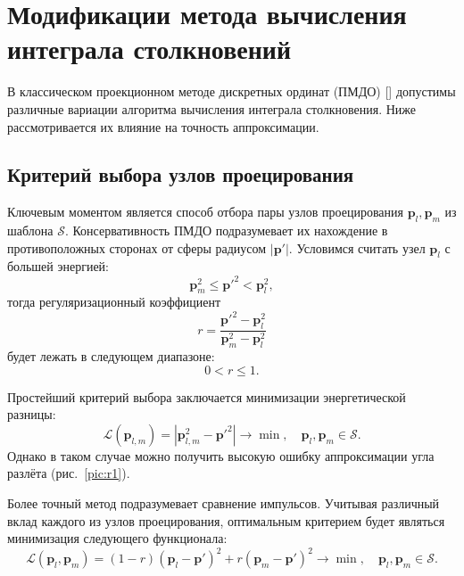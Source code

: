 \documentclass[english,russian,a4paper,12pt]{article}
\begin{document}
\tableofcontents

\section{Модификации метода вычисления интеграла столкновений}
В классическом проекционном методе дискретных ординат (ПМДО) [] допустимы различные вариации
алгоритма вычисления интеграла столкновения.
Ниже рассмотривается их влияние на точность аппроксимации.

\subsection{Критерий выбора узлов проецирования}

Ключевым моментом является способ отбора пары узлов проецирования \(\mathbf{p}_l,\mathbf{p}_m\) из шаблона \(\mathcal{S}\).
Консервативность ПМДО подразумевает их нахождение в противоположных сторонах от сферы радиусом \( \left|\mathbf{p}'\right| \).
Условимся считать узел \(\mathbf{p}_l\) с большей энергией:
\begin{equation}\label{eq:exist_nodes}
	\mathbf{p}_m^2 \leqslant \mathbf{p}'^2 < \mathbf{p}_l^2,
\end{equation}
тогда регуляризационный коэффициент
\begin{equation}\label{eq:r_koef}
	r = \frac{\mathbf{p}'^2-\mathbf{p}_l^2}{\mathbf{p}_m^2-\mathbf{p}_l^2}
\end{equation}
будет лежать в следующем диапазоне:
\begin{equation}\label{eq:r_criterion}
	0 < r \leqslant 1.
\end{equation}

Простейший критерий выбора заключается минимизации энергетической разницы:
\begin{equation}\label{eq:min_delta_E}
	\mathcal{L}(\mathbf{p}_{l,m}) = \left|\mathbf{p}_{l,m}^2-\mathbf{p}'^2\right| \rightarrow \min, \quad \mathbf{p}_l,\mathbf{p}_m \in \mathcal{S}.
\end{equation}
Однако в таком случае можно получить высокую ошибку аппроксимации угла разлёта (рис.~\ref{pic:r1}).

Более точный метод подразумевает сравнение импульсов.
Учитывая различный вклад каждого из узлов проецирования,
оптимальным критерием будет являться минимизация следующего функционала:
\begin{equation}\label{eq:min_delta_p}
	\mathcal{L}(\mathbf{p}_l,\mathbf{p}_m) = (1-r)(\mathbf{p}_l-\mathbf{p}')^2 + r(\mathbf{p}_m-\mathbf{p}')^2 \rightarrow \min,
	\quad \mathbf{p}_l,\mathbf{p}_m \in \mathcal{S}.
\end{equation}
\end{document}
